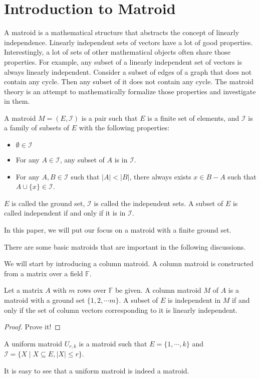 \section{Introduction to Matroid}

A matroid is a mathematical structure that abstracts the concept of linearly independence.
Linearly independent sets of vectors have a lot of good properties.
Interestingly, a lot of sets of other mathematical objects often share those properties.
For example, any subset of a linearly independent set of vectors is always linearly independent.
Consider a subset of edges of a graph that does not contain any cycle.
Then any subset of it does not contain any cycle.
The matroid theory is an attempt to mathematically formalize those properties and investigate in them.

\begin{defn}
A matroid $M = (E, \mathcal{I})$ is a pair such that $E$ is a finite set of elements, and $\mathcal{I}$ is a family of subsets of $E$ with the following properties:
\begin{itemize}
\item $\emptyset \in \mathcal{I}$
\item For any $A\in \mathcal{I}$, any subset of $A$ is in $\mathcal{I}$.
\item For any $A, B \in \mathcal{I}$ such that $\lvert A \rvert < \lvert B \rvert$, there always exists $x \in B - A$ such that $A \cup \{ x \} \in \mathcal{I}$.
\end{itemize}
$E$ is called the ground set, $\mathcal{I}$ is called the independent sets. A subset of $E$ is called independent if and only if it is in $\mathcal{I}$.
\end{defn}

In this paper, we will put our focus on a matroid with a finite ground set.

There are some basic matroids that are important in the following discussions.

We will start by introducing a column matroid. 
A column matroid is constructed from a matrix over a field $\mathbb{F}$.

\begin{defn}
Let a matrix $A$ with $m$ rows over $\mathbb{F}$ be given.
A column matroid $M$ of $A$ is a matroid with a ground set $\{ 1, 2, \cdots m \}$.
A subset of $E$ is independent in $M$ if and only if the set of column vectors corresponding to it is linearly independent.
\end{defn}

\begin{proof}
Prove it!
\end{proof}


\begin{defn}
A uniform matroid $U_{r, k}$ is a matroid such that $E = \{ 1, \cdots, k \}$ and $\mathcal{I} = \{ X \mid  X \subseteq E, \lvert X \rvert \leq r \}$.
\end{defn}

It is easy to see that a uniform matroid is indeed a matroid.

